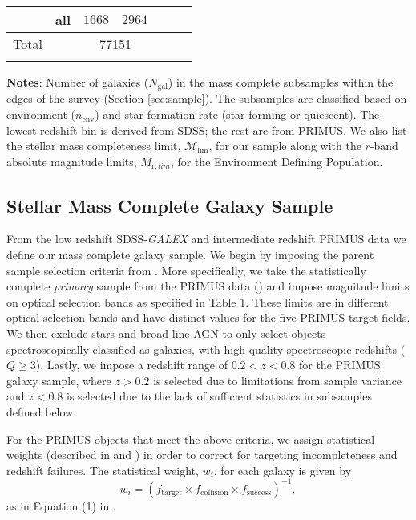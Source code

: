 \documentclass{emulateapj}
\begin{document}
\begin{table*}
\begin{center}
\begin{tabular}{ccccccc}
               & all              & $1668$                      & $2964$                          \\ \hline
Total &      & \multicolumn{2}{c}{77151} & \\ \hline
  \multicolumn{4}{l}{}                                             \\       
    \end{tabular} \par
    \end{center}
    {\bf Notes}: Number of galaxies ($N_{\mathrm{gal}}$) in the mass complete subsamples within the edges of the survey (Section \ref{sec:sample}). The subsamples are classified based on environment ($n_{\mathrm{env}}$) and star formation rate (star-forming or quiescent). The lowest redshift bin is derived from SDSS; the rest are from PRIMUS. We also list the stellar mass completeness limit, $\mathcal{M}_{\mathrm{lim}}$, for our sample along with the $r$-band absolute magnitude limits, $M_{\mathrm{r}, lim}$, for the Environment Defining Population. 
    \bigskip
\end{table*}

\subsection{Stellar Mass Complete Galaxy Sample} \label{sec:target} 
From the low redshift SDSS-{\em GALEX} and intermediate redshift
PRIMUS data we define our mass complete galaxy
sample. We begin by imposing the parent sample selection criteria from
\cite{Moustakas:2013aa}. More specifically, we take the statistically
complete {\em primary} sample from the PRIMUS data
(\citealt{Coil:2011aa}) and impose magnitude limits on optical
selection bands as specified in \cite{Moustakas:2013aa} Table 1. These
limits are in different optical selection bands and have distinct
values for the five PRIMUS target fields. We then exclude stars and
broad-line AGN to only select objects spectroscopically classified as
galaxies, with high-quality spectroscopic redshifts ($Q \geq
3$). Lastly, we impose a redshift range of $ 0.2 < z < 0.8$ for the
PRIMUS galaxy sample, where $ z > 0.2$ is selected due to limitations
from sample variance and $ z < 0.8$ is selected due to the lack of
sufficient statistics in subsamples defined below.

For the PRIMUS objects that meet the above criteria, we assign statistical weights (described in \citealt{Coil:2011aa} and \citealt{Cool:2013aa}) in order to correct for targeting incompleteness and redshift failures. The statistical weight, $w_i$, for each galaxy is given by
\begin{equation}
w_{i} = (f_{\mathrm{target}} \times f_{\mathrm{collision}} \times f_{\mathrm{success}})^{-1},
\end{equation}
as in Equation (1) in \cite{Moustakas:2013aa}. 
\end{document}
